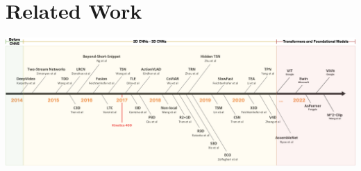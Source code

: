 \section{Related Work}

\begin{frame}

    \vspace{1em}

    \centering
    \includegraphics[width=1\textwidth]{../../assets/figures/extended-video-timeline-v3.png}

    \cite{video-action-recognition-study}
\end{frame}









